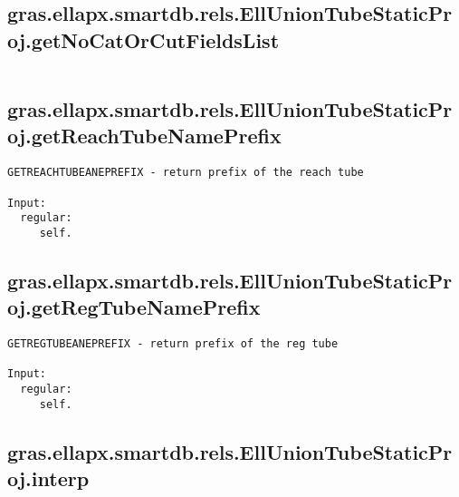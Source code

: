 \subsection{\texorpdfstring{gras.ellapx.smartdb.rels.EllUnionTubeStaticProj.getNoCatOrCutFieldsList}{getNoCatOrCutFieldsList}}\label{method:gras.ellapx.smartdb.rels.EllUnionTubeStaticProj.getNoCatOrCutFieldsList}
\begin{verbatim}

\end{verbatim}
\subsection{\texorpdfstring{gras.ellapx.smartdb.rels.EllUnionTubeStaticProj.getReachTubeNamePrefix}{getReachTubeNamePrefix}}\label{method:gras.ellapx.smartdb.rels.EllUnionTubeStaticProj.getReachTubeNamePrefix}
\begin{verbatim}
GETREACHTUBEANEPREFIX - return prefix of the reach tube

Input:
  regular:
     self.
\end{verbatim}
\subsection{\texorpdfstring{gras.ellapx.smartdb.rels.EllUnionTubeStaticProj.getRegTubeNamePrefix}{getRegTubeNamePrefix}}\label{method:gras.ellapx.smartdb.rels.EllUnionTubeStaticProj.getRegTubeNamePrefix}
\begin{verbatim}
GETREGTUBEANEPREFIX - return prefix of the reg tube

Input:
  regular:
     self.
\end{verbatim}
\subsection{\texorpdfstring{gras.ellapx.smartdb.rels.EllUnionTubeStaticProj.interp}{interp}}\label{method:gras.ellapx.smartdb.rels.EllUnionTubeStaticProj.interp}
\begin{verbatim}

\end{verbatim}
